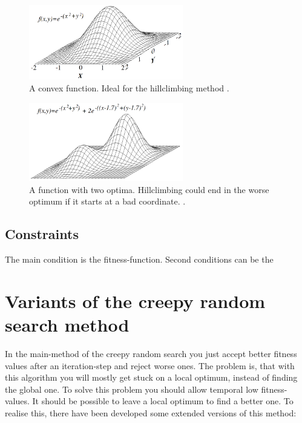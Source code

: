 \documentclass[10pt,a4paper,DIV=11]{scrreprt}
\begin{document}
\begin{center}
	\begin{figure}[H]
		\centering
		\includegraphics[width=0.6\textwidth,scale=1]{files/Hill_climb.png}  
		\caption{A convex function. Ideal for the hillclimbing method \cite{wiki-hill}.}
		\label{fig:hill}
	\end{figure}
\end{center}

\begin{center}
	\begin{figure}[H]
		\centering
		\includegraphics[width=0.6\textwidth,scale=1]{files/Local_maximum.png}  
		\caption{A function with two optima. Hillclimbing could end in the worse optimum if it starts at a bad coordinate. \cite{wiki-hill}.}
		\label{fig:hill2}
	\end{figure}
\end{center}


\subsection{Constraints} %
The main condition is the fitness-function. Second conditions
can be the


\section{Variants of the creepy random search method}
In the main-method of the creepy random search you just accept better fitness values after an iteration-step and reject worse ones.
The problem is, that with this algorithm you will mostly get stuck on a local optimum, instead of finding the global one.
To solve this problem you should allow temporal low fitness-values. It should be possible to leave a local optimum to find a better one.
To realise this, there have been developed some extended versions of this method: \\
\end{document}
